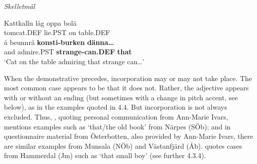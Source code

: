 
\item 

\textit{Skelletmål}



 \ea\label{}
\gll Kattkalln  låg  oppa  bolä\\


tomcat.DEF  lie.PST  on  table.DEF\\

 \ea\label{}
\gll å  beunnrä  \textbf{konsti-burken}\textbf{  dänna…}\\


and  admire.PST  \textbf{strange-can.DEF} \textbf{that}\\

\glt ‘Cat on the table admiring that strange can…’

\z

When the demonstrative precedes, incorporation may or may not take place. The most common case appears to be that it does not. Rather, the adjective appears with or without an ending (but sometimes with a change in pitch accent, see below), as in the examples quoted in 4.4. But incorporation is not always excluded. Thus, \citet[159]{Vangsnes2003}, quoting personal communication from Ann-Marie Ivars, mentions examples such as ‘that/the old book’ from Närpes (SÖb); and in questionnaire material from Österbotten, also provided by Ann-Marie Ivars, there are similar examples from Munsala (NÖb) and Västanfjärd (Åb). \citet[38]{Reinhammar2005} quotes cases from Hammerdal (Jm) such as ‘that small boy’ (see further 4.3.4).


